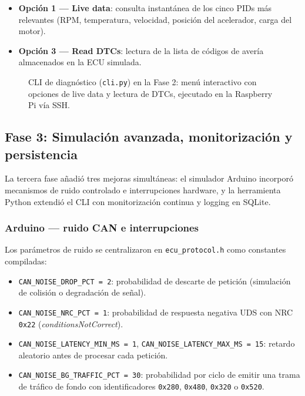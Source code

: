 \begin{itemize}
    \item \textbf{Opción 1 — Live data}: consulta instantánea de los cinco PIDs más relevantes (RPM, temperatura, velocidad, posición del acelerador, carga del motor).
    \item \textbf{Opción 3 — Read DTCs}: lectura de la lista de códigos de avería almacenados en la ECU simulada.
\end{itemize}

\begin{figure}[!htbp]
\centering
\caption{CLI de diagnóstico (\texttt{cli.py}) en la Fase 2: menú interactivo con opciones de live data y lectura de DTCs, ejecutado en la Raspberry Pi vía SSH.}
\label{fig:fase2_cli}
\end{figure}


\subsection{Fase 3: Simulación avanzada, monitorización y persistencia}
\label{sec:fase3}

La tercera fase añadió tres mejoras simultáneas: el simulador Arduino incorporó mecanismos de ruido controlado e interrupciones hardware, y la herramienta Python extendió el CLI con monitorización continua y logging en SQLite.

\subsubsection*{Arduino — ruido CAN e interrupciones}

Los parámetros de ruido se centralizaron en \texttt{ecu\_protocol.h} como constantes compiladas:

\begin{itemize}
    \item \texttt{CAN\_NOISE\_DROP\_PCT = 2}: probabilidad de descarte de petición (simulación de colisión o degradación de señal).
    \item \texttt{CAN\_NOISE\_NRC\_PCT = 1}: probabilidad de respuesta negativa UDS con NRC \texttt{0x22} (\textit{conditionsNotCorrect}).
    \item \texttt{CAN\_NOISE\_LATENCY\_MIN\_MS = 1}, \texttt{CAN\_NOISE\_LATENCY\_MAX\_MS = 15}: retardo aleatorio antes de procesar cada petición.
    \item \texttt{CAN\_NOISE\_BG\_TRAFFIC\_PCT = 30}: probabilidad por ciclo de emitir una trama de tráfico de fondo con identificadores \texttt{0x280}, \texttt{0x480}, \texttt{0x320} o \texttt{0x520}.
\end{itemize}

